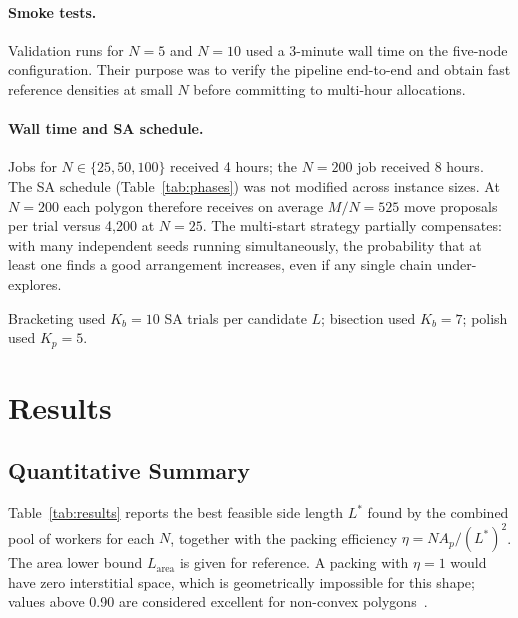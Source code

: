 \documentclass[10pt,twocolumn]{article}
\begin{document}
\paragraph{Smoke tests.}
Validation runs for $N=5$ and $N=10$ used a 3-minute wall time on
the five-node configuration. Their purpose was to verify the pipeline
end-to-end and obtain fast reference densities at small $N$ before
committing to multi-hour allocations.

\paragraph{Wall time and SA schedule.}
Jobs for $N \in \{25, 50, 100\}$ received 4 hours; the $N=200$ job
received 8 hours. The SA schedule (Table~\ref{tab:phases}) was not
modified across instance sizes. At $N=200$ each polygon therefore
receives on average $M/N = 525$ move proposals per trial versus
4{,}200 at $N=25$. The multi-start strategy partially compensates: with
many independent seeds running simultaneously, the probability that at
least one finds a good arrangement increases, even if any single chain
under-explores.

Bracketing used $K_b = 10$ SA trials per candidate $L$; bisection
used $K_b = 7$; polish used $K_p = 5$.

\section{Results}
\label{sec:results}

\subsection{Quantitative Summary}

Table~\ref{tab:results} reports the best feasible side length $L^*$
found by the combined pool of workers for each $N$, together with the
packing efficiency $\eta = NA_p/(L^*)^2$. The area lower bound
$L_{\mathrm{area}}$ is given for reference. A packing with $\eta = 1$
would have zero interstitial space, which is geometrically impossible
for this shape; values above 0.90 are considered excellent for
non-convex polygons~\cite{leung2003}.
\end{document}
